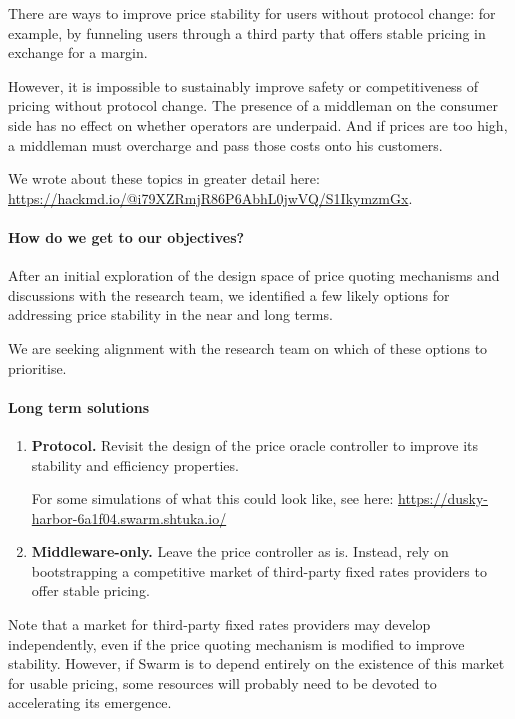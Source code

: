 There are ways to improve price stability for users without protocol change: for example, by funneling users through a third party that offers stable pricing in exchange for a margin.

However, it is impossible to sustainably improve safety or competitiveness of pricing without protocol change. 
%
The presence of a middleman on the consumer side has no effect on whether operators are underpaid. 
%
And if prices are too high, a middleman must overcharge and pass those costs onto his customers.

We wrote about these topics in greater detail here: \url{https://hackmd.io/@i79XZRmjR86P6AbhL0jwVQ/S1IkymzmGx}.


\paragraph{How do we get to our objectives?}
%
After an initial exploration of the design space of price quoting mechanisms and discussions with the research team, we identified a few likely options for addressing price stability in the near and long terms.

We are seeking alignment with the research team on which of these options to prioritise.

\paragraph{Long term solutions}

\begin{enumerate}
  \item \textbf{Protocol.} Revisit the design of the price oracle controller to improve its stability and efficiency properties.

  For some simulations of what this could look like, see here: \url{https://dusky-harbor-6a1f04.swarm.shtuka.io/}
  \item \textbf{Middleware-only.} Leave the price controller as is. Instead, rely on bootstrapping a competitive market of third-party fixed rates providers to offer stable pricing.
\end{enumerate}

Note that a market for third-party fixed rates providers may develop independently, even if the price quoting mechanism is modified to improve stability.
%
However, if Swarm is to depend entirely on the existence of this market for usable pricing, some resources will probably need to be devoted to accelerating its emergence.

